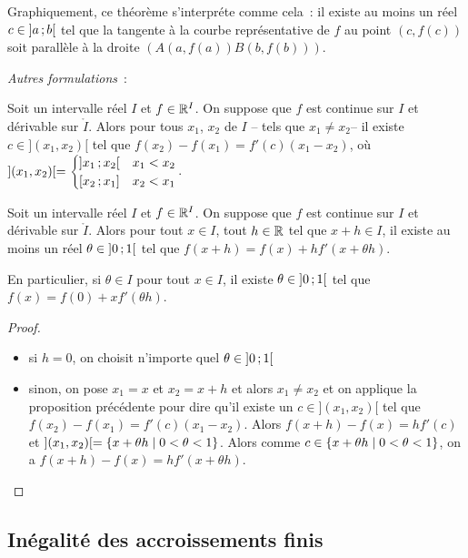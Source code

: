 Graphiquement, ce théorème s'interpréte comme cela~: il existe au moins un réel \(c \in \left] a \, ;  b \right[\) tel que la tangente à la courbe représentative de \(f\) au point \((c,f(c))\) soit parallèle à la droite \((A(a,f(a))B(b,f(b)))\).

\emph{Autres formulations}~:

\begin{prop}
  Soit un intervalle réel \(I\) et \(f \in \mathbb{R}^I\). On suppose que \(f\) est continue sur \(I\) et dérivable sur \(\mathring{I}\). Alors pour tous \(x_1\), \(x_2\) de \(I\) -- tels que \(x_1 \neq x_2\)-- il existe \(c \in ](x_1,x_2)[\) tel que \(f(x_2)-f(x_1)=f'(c)(x_1-x_2)\), où \( ](x_1,x_2)[ = \begin{cases} \left] x_1 \, ;  x_2 \right[ & x_1 < x_2 \\ \left[ x_2 \, ;  x_1 \right] & x_2 < x_1 \end{cases}\).
\end{prop}
\begin{prop}
  Soit un intervalle réel \(I\) et \(f \in \mathbb{R}^I\). On suppose que \(f\) est continue sur \(I\) et dérivable sur \(\mathring{I}\). Alors pour tout \(x \in I\), tout \(h \in \mathbb{R}\) tel que \(x+h \in I\), il existe au moins un réel \(\theta \in \left] 0 \, ;  1 \right[\) tel que \(f(x+h)=f(x)+hf'(x+\theta h)\). 

En particulier, si \(\theta \in I\) pour tout \(x \in I\), il existe \(\theta \in \left] 0 \, ;  1 \right[\) tel que \(f(x)=f(0)+xf'(\theta h)\).
\end{prop}
\begin{proof}
  \begin{itemize}
  \item si \(h=0\), on choisit n'importe quel \(\theta \in \left] 0 \, ;  1 \right[\)
  \item sinon, on pose \(x_1=x\) et \(x_2=x+h\) et alors \(x_1 \neq x_2\) et on applique la proposition précédente pour dire qu'il existe un \(c \in ](x_1,x_2)[\) tel que \(f(x_2)-f(x_1)=f'(c)(x_1-x_2)\). Alors \(f(x+h)-f(x)=hf'(c)\) et \(](x_1,x_2)[ = \left\{x+\theta h\mathrel{}\middle|\mathrel{}0 < \theta < 1\right\}\). Alors comme \(c \in \left\{x+\theta h\mathrel{}\middle|\mathrel{}0 < \theta < 1\right\}\), on a \(f(x+h)-f(x)=hf'(x + \theta h)\).
  \end{itemize}
\end{proof}

\subsection{Inégalité des accroissements finis}

